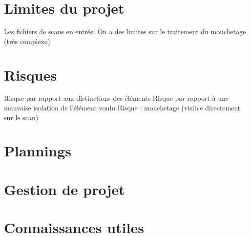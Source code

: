 \documentclass[12pt,titlepage]{report}
\begin{document}
\section{Limites du projet}

Les fichiers de scans en entrée.
On a des limites sur le traitement du mouchetage (très complexe)

\section{Risques}

Risque par rapport aux distinctions des éléments
Risque par rapport à une mauvaise isolation de l'élément voulu
Risque : mouchetage (visible directement sur le scan)


\section{Plannings}


\section{Gestion de projet}


\section{Connaissances utiles}
\begin{justify}

\end{justify}\par
\end{document}
